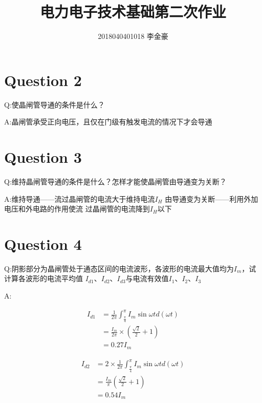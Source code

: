 \documentclass[a4paper]{article}
\begin{document}
\songti

\title{电力电子技术基础第二次作业}
\author{2018040401018 李金豪}

\maketitle

\section{Question 2}

Q:使晶闸管导通的条件是什么？

A:晶闸管承受正向电压，且仅在门级有触发电流的情况下才会导通

\section{Question 3}

Q:维持晶闸管导通的条件是什么？怎样才能使晶闸管由导通变为关断？

A:维持导通——流过晶闸管的电流大于维持电流$I_H$ 由导通变为关断——利用外加电压和外电路的作用使流
过晶闸管的电流降到$I_H$以下

\section{Question 4}

Q:阴影部分为晶闸管处于通态区间的电流波形，各波形的电流最大值均为$I_m$，试计算各波形的电流平均值
$I_{d1}$、$I_{d2}$、$I_{d3}$与电流有效值$I_{1}$、$I_{2}$、$I_{3}$

A:

\begin{equation}
    \begin{aligned}
        I_{d1} & = \frac{1}{2\pi}\int_{\frac{\pi}{4}}^{\pi} I_m \sin{\omega t} d(\omega t) \\
               & = \frac{I_m}{2\pi}\times (\frac{\sqrt{2}}{2}+1)                           \\
               & = 0.27I_m
    \end{aligned}
\end{equation}

\begin{equation}
    \begin{aligned}
        I_{d2} & = 2\times\frac{1}{2\pi}\int_{\frac{\pi}{4}}^{\pi} I_m \sin{\omega t} d(\omega t) \\
               & = \frac{I_m}{\pi}(\frac{\sqrt{2}}{2}+1)                                          \\
               & = 0.54I_m
    \end{aligned}
\end{equation}
\end{document}
